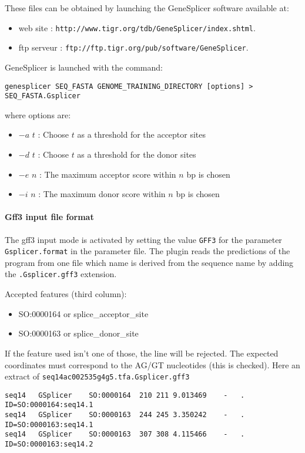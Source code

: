 These files can be obtained by launching the GeneSplicer software
available at:
\begin{itemize}
\item  web site : \texttt{http://www.tigr.org/tdb/GeneSplicer/index.shtml}.
\item  ftp serveur : \texttt{ftp://ftp.tigr.org/pub/software/GeneSplicer}.
\end{itemize}

GeneSplicer is launched with the command:
\begin{Verbatim}[fontsize=\small]
genesplicer SEQ_FASTA GENOME_TRAINING_DIRECTORY [options] > SEQ_FASTA.Gsplicer
\end{Verbatim}
where options are:
\begin{itemize}
\item $-a$ $t$ : Choose $t$ as a threshold for the acceptor sites
\item $-d$ $t$ : Choose $t$ as a threshold for the donor sites
\item $-e$ $n$ : The maximum acceptor score within $n$ bp is chosen
\item $-i$ $n$ : The maximum donor score within $n$ bp is chosen
\end{itemize}

\paragraph{Gff3 input file format}

The gff3 input mode is activated by setting the value \texttt{GFF3}
for the parameter \texttt{Gsplicer.format} in the parameter file.  The
plugin reads the predictions of the program from one file which name
is derived from the sequence name by adding the
\texttt{.Gsplicer.gff3} extension.

Accepted features (third column):\\
\begin{itemize}
\item  SO:0000164 or splice\_acceptor\_site 
\item  SO:0000163 or splice\_donor\_site 
\end{itemize}
If the feature used isn't one of those, the line will be rejected. The
expected coordinates must correspond to the AG/GT nucleotides (this is
checked).  Here an extract of \texttt{seq14ac002535g4g5.tfa.Gsplicer.gff3}
\begin{Verbatim}[fontsize=\tiny]
seq14	GSplicer	SO:0000164	210	211	9.013469	-	.	ID=SO:0000164:seq14.1
seq14	GSplicer	SO:0000163	244	245	3.350242	-	.	ID=SO:0000163:seq14.1
seq14	GSplicer	SO:0000163	307	308	4.115466	-	.	ID=SO:0000163:seq14.2
\end{Verbatim}

